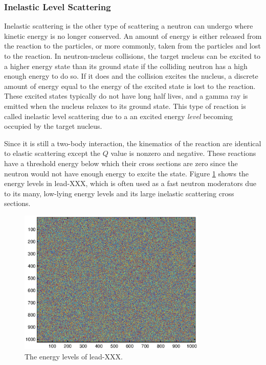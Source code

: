 \subsubsection{Inelastic Level Scattering}

Inelastic scattering is the other type of scattering a neutron can undergo where kinetic energy is no longer conserved.  An amount of energy is either released from the reaction to the particles, or more commonly, taken from the particles and lost to the reaction.  In neutron-nucleus collisions, the target nucleus can be excited to a higher energy state than its ground state if the colliding neutron has a high enough energy to do so.  If it does and the collision excites the nucleus, a discrete amount of energy equal to the energy of the excited state is lost to the reaction.  These excited states typically do not have long half lives, and a gamma ray is emitted when the nucleus relaxes to its ground state.  This type of reaction is called inelastic level scattering due to a an excited energy \emph{level} becoming occupied by the target nucleus.  

Since it is still a two-body interaction, the kinematics of the reaction are identical to elastic scattering except the $Q$ value is nonzero and negative.  These reactions have a threshold energy below which their cross sections are zero since the neutron would not have enough energy to excite the state.   Figure \ref{Elevels} shows the energy levels in lead-XXX, which is often used as a fast neutron moderators due to its many, low-lying energy levels and its large inelastic scattering cross sections.

\begin{figure}[h!]
  \label{Elevels}
  \centering
    \includegraphics[width=0.8\textwidth]{graphics/noise.eps}
     \caption{The energy levels of lead-XXX\cite{}.}
\end{figure}

